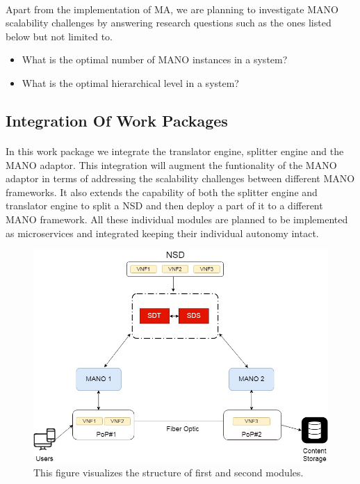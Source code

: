 \paragraph{}
Apart from the implementation of MA, we are planning to investigate MANO scalability challenges by answering research questions such as the ones listed below but not limited to.
\begin{itemize}
	\item What is the optimal number of MANO instances in a system?
	\item What is the optimal hierarchical level in a system?
\end{itemize}


\subsection{Integration Of Work Packages}
\paragraph{}

In this work package we integrate the translator engine, splitter engine and the MANO adaptor. This integration will augment the funtionality of the MANO adaptor in terms of addressing the scalability challenges between different MANO frameworks. It also extends the capability of both the splitter engine and translator engine to split a NSD and then deploy a part of it to a different MANO framework. All these individual modules are planned to be implemented as microservices and integrated keeping their individual autonomy intact. 

\begin{figure}[h]
	\centering
	\includegraphics[width=0.7\linewidth]{figures/Structure1}
	\caption{This figure visualizes the structure of first and second modules. }
	\label{fig:structure1}
\end{figure}

